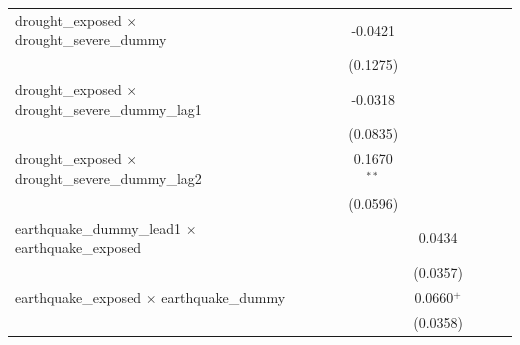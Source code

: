 \begin{tabular}{lcccccccc}
   drought\_exposed $\times$ drought\_severe\_dummy                   &                       &                       &                       & -0.0421               &                       &                       &                       &   \\   
                                                                      &                       &                       &                       & (0.1275)              &                       &                       &                       &   \\   
   drought\_exposed $\times$ drought\_severe\_dummy\_lag1             &                       &                       &                       & -0.0318               &                       &                       &                       &   \\   
                                                                      &                       &                       &                       & (0.0835)              &                       &                       &                       &   \\   
   drought\_exposed $\times$ drought\_severe\_dummy\_lag2             &                       &                       &                       & 0.1670$^{**}$         &                       &                       &                       &   \\   
                                                                      &                       &                       &                       & (0.0596)              &                       &                       &                       &   \\   
   earthquake\_dummy\_lead1 $\times$ earthquake\_exposed              &                       &                       &                       &                       & 0.0434                &                       &                       &   \\   
                                                                      &                       &                       &                       &                       & (0.0357)              &                       &                       &   \\   
   earthquake\_exposed $\times$ earthquake\_dummy                     &                       &                       &                       &                       & 0.0660$^{+}$          &                       &                       &   \\   
                                                                      &                       &                       &                       &                       & (0.0358)              &                       &                       &   \\   

\end{tabular}

